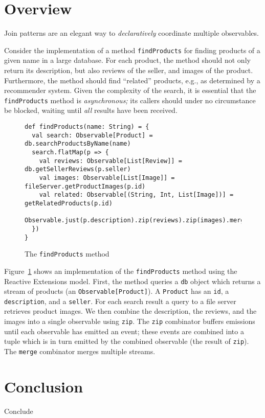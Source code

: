 \documentclass[runningheads]{llncs}
\begin{document}
\begin{sloppypar}
\section{Overview}

Join patterns are an elegant way to {\em declaratively} coordinate multiple
observables.

Consider the implementation of a method \verb|findProducts| for finding
products of a given name in a large database. For each product, the method
should not only return its description, but also reviews of the seller, and
images of the product. Furthermore, the method should find ``related''
products, e.g., as determined by a recommender system. Given the complexity of
the search, it is essential that the \verb|findProducts| method is {\em
asynchronous;} its callers should under no circumstance be blocked, waiting
until {\em all} results have been received.

\begin{figure}[ht]
\centering
\begin{lstlisting}
def findProducts(name: String) = {
  val search: Observable[Product] = db.searchProductsByName(name)
  search.flatMap(p => {
    val reviews: Observable[List[Review]] = db.getSellerReviews(p.seller)
    val images: Observable[List[Image]] = fileServer.getProductImages(p.id)
    val related: Observable[(String, Int, List[Image])] = getRelatedProducts(p.id)
    Observable.just(p.description).zip(reviews).zip(images).merge(related)
  })
}
\end{lstlisting}
\caption{The \texttt{findProducts} method}
\label{fig:find-products}
\end{figure}

Figure~\ref{fig:find-products} shows an implementation of the
\verb|findProducts| method using the Reactive Extensions model. First, the
method queries a \verb|db| object which returns a stream of products (an
\verb|Observable[Product]|). A \verb|Product| has an \verb|id|, a
\verb|description|, and a \verb|seller|. For each search result a query to a
file server retrieves product images. We then combine the description, the
reviews, and the images into a single observable using \verb|zip|. The
\verb|zip| combinator buffers emissions until each observable has emitted an
event; these events are combined into a tuple which is in turn emitted by the
combined observable (the result of \verb|zip|). The \verb|merge| combinator
merges multiple streams.


\section{Conclusion}
\label{sec:conclusion}

Conclude




\end{sloppypar}
\end{document}
